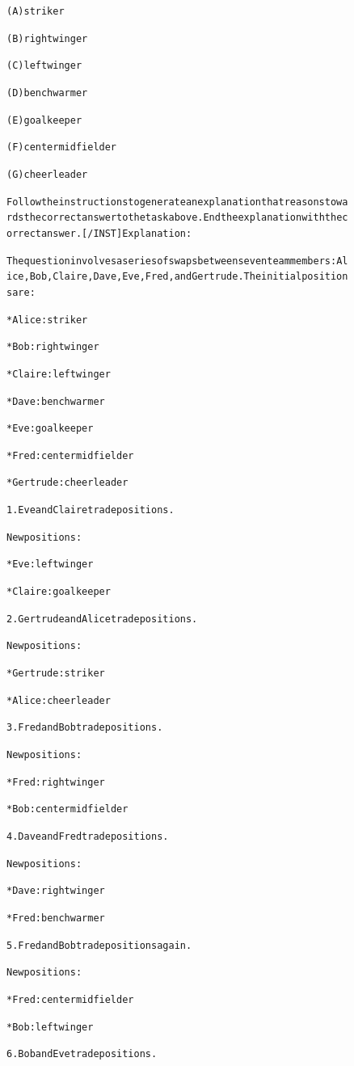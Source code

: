 \begin{figure}[t]
{{\begin{alltt}
(A) striker

(B) right winger

(C) left winger

(D) benchwarmer

(E) goalkeeper

(F) center midfielder

(G) cheerleader

Follow the instructions to generate an explanation that reasons towards the correct answer to the task above. End the explanation with the correct answer. [/INST] Explanation: 

The question involves a series of swaps between seven team members: Alice, Bob, Claire, Dave, Eve, Fred, and Gertrude. The initial positions are:

* Alice: striker

* Bob: right winger

* Claire: left winger

* Dave: benchwarmer

* Eve: goalkeeper

* Fred: center midfielder

* Gertrude: cheerleader

1. Eve and Claire trade positions.

New positions:

* Eve: left winger

* Claire: goalkeeper

2. Gertrude and Alice trade positions.

New positions:

* Gertrude: striker

* Alice: cheerleader

3. Fred and Bob trade positions.

New positions:

* Fred: right winger

* Bob: center midfielder

4. Dave and Fred trade positions.

New positions:

* Dave: right winger

* Fred: benchwarmer

5. Fred and Bob trade positions again.

New positions:

* Fred: center midfielder

* Bob: left winger

6. Bob and Eve trade positions.


\end{alltt}}}
\end{figure}
